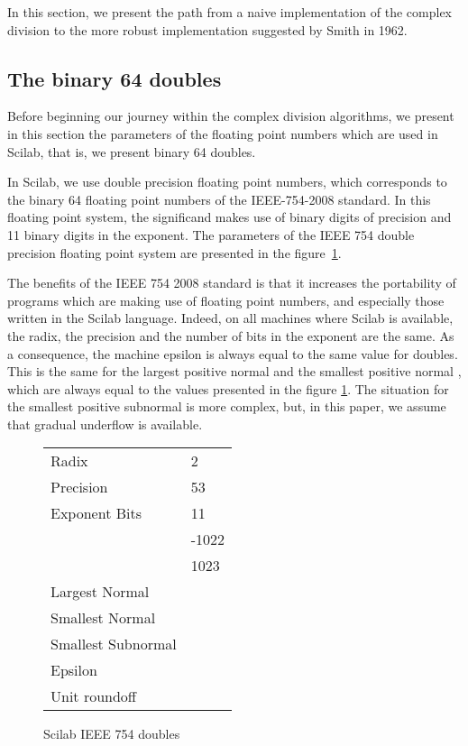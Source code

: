 \documentclass{paper}
\begin{document}
In this section, we present the path from a naive implementation 
of the complex division to the more robust implementation suggested 
by Smith in 1962. 

\subsection{The binary 64 doubles}
Before beginning our journey within the complex division algorithms, 
we present in this section the parameters of the floating point 
numbers which are used in Scilab, that is, we present binary 64 doubles.

In Scilab, we use double precision floating point numbers, which  
corresponds to the binary 64 floating point numbers of the IEEE-754-2008 
\cite{P754:2008:ISF} standard. 
In this floating point system, the significand makes use 
of  binary digits of precision and 11 binary digits in the exponent. 
The parameters of the IEEE 754 double precision floating point 
system are presented in the figure~\ref{fig-doubles-properties}.

The benefits of the IEEE 754 2008 standard \cite{P754:2008:ISF} is that it 
increases the portability of programs which are making use of floating point numbers, 
and especially those written in the Scilab language. 
Indeed, on all machines where Scilab is available, the radix, the precision and 
the number of bits in the exponent are the same. 
As a consequence, the machine epsilon  is always equal 
to the same value for doubles.
This is the same for the largest positive normal  and 
the smallest positive normal , which are always 
equal to the values presented in the figure \ref{fig-doubles-properties}.
The situation for the smallest positive subnormal  is more complex, 
but, in this paper, we assume that gradual underflow is available.

\begin{figure}
\caption{Scilab IEEE 754 doubles}
\label{fig-doubles-properties}
\begin{center}
\begin{tabular}{|ll|}
\hline
Radix  & 2  \\
Precision  & 53 \\
Exponent Bits & 11 \\
 & -1022 \\
 & 1023 \\
Largest Normal  &  \\
Smallest Normal  &  \\
Smallest Subnormal  &  \\
Epsilon  &  \\
Unit roundoff  &  \\
\hline
\end{tabular}
\end{center}
\end{figure}
\end{document}

